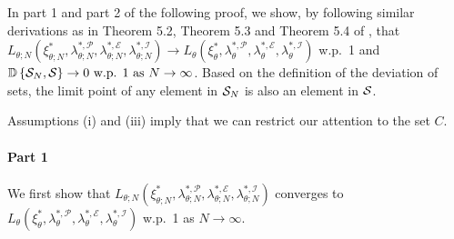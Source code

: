 In part 1 and part 2 of the following proof, we show, by following similar derivations as in Theorem 5.2, Theorem 5.3 and Theorem 5.4 of \citet{Shapiro2009}, that $L_{\theta;N}(\xi^*_{\theta;N},\lambda^{*,\mathcal P}_{\theta;N},\lambda^{*,\mathcal E}_{\theta;N},\lambda^{*,\mathcal I}_{\theta;N})\rightarrow L_{\theta}(\xi^*_{\theta},\lambda^{*,\mathcal P}_{\theta},\lambda^{*,\mathcal E}_{\theta},\lambda^{*,\mathcal I}_{\theta})$ w.p.~1 and $\mathbb D \left\{ {\mathcal S_{N}}, {\mathcal S}\right\} \to 0 \textrm{ w.p. } 1 \textrm{ as } N \to \infty$. Based on the definition of the deviation of sets, the limit point of any element in $\mathcal S_{N}$ is also an element in $\mathcal S$.

Assumptions (i) and (iii) imply that we can restrict our attention to the set $C$.

\paragraph{Part 1}
We first show that $L_{\theta;N}(\xi^*_{\theta;N},\lambda^{*,\mathcal P}_{\theta;N},\lambda^{*,\mathcal E}_{\theta;N},\lambda^{*,\mathcal I}_{\theta;N})$ converges to $L_{\theta}(\xi^*_{\theta},\lambda^{*,\mathcal P}_{\theta},\lambda^{*,\mathcal E}_{\theta},\lambda^{*,\mathcal I}_{\theta})$ w.p.~1 as $N\to \infty$.


